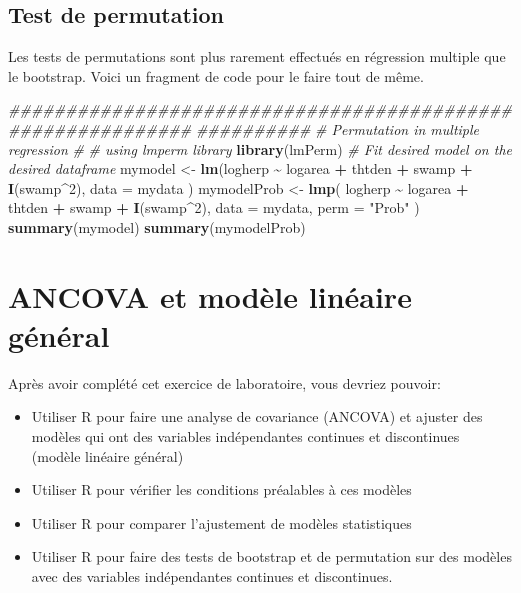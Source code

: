 \documentclass[
  12pt,
]{book}
\newenvironment{Shaded}{\begin{snugshade}}{\end{snugshade}}
\newcommand{\CommentTok}[1]{\textcolor[rgb]{0.56,0.35,0.01}{\textit{#1}}}
\newcommand{\DataTypeTok}[1]{\textcolor[rgb]{0.13,0.29,0.53}{#1}}
\newcommand{\DecValTok}[1]{\textcolor[rgb]{0.00,0.00,0.81}{#1}}
\newcommand{\KeywordTok}[1]{\textcolor[rgb]{0.13,0.29,0.53}{\textbf{#1}}}
\newcommand{\NormalTok}[1]{#1}
\newcommand{\OperatorTok}[1]{\textcolor[rgb]{0.81,0.36,0.00}{\textbf{#1}}}
\newcommand{\StringTok}[1]{\textcolor[rgb]{0.31,0.60,0.02}{#1}}
\providecommand{\tightlist}{%
  \setlength{\itemsep}{0pt}\setlength{\parskip}{0pt}}
\begin{document}
\hypertarget{perm_reg_mult}{%
\section{Test de permutation}\label{perm_reg_mult}}

Les tests de permutations sont plus rarement effectués en régression multiple que le bootstrap. Voici un fragment de code pour le faire tout de même.

\begin{Shaded}
\begin{Highlighting}[]
\CommentTok{\#\#\#\#\#\#\#\#\#\#\#\#\#\#\#\#\#\#\#\#\#\#\#\#\#\#\#\#\#\#\#\#\#\#\#\#\#\#\#\#\#\#\#\#\#\#\#\#\#\#\#\#\#\#\#\#\#\#\#\#}
\CommentTok{\#\#\#\#\#\#\#\#\#\#}
\CommentTok{\# Permutation in multiple regression}
\CommentTok{\#}
\CommentTok{\# using lmperm library}
\KeywordTok{library}\NormalTok{(lmPerm)}
\CommentTok{\# Fit desired model on the desired dataframe}
\NormalTok{mymodel \textless{}{-}}\StringTok{ }\KeywordTok{lm}\NormalTok{(logherp }\OperatorTok{\textasciitilde{}}\StringTok{ }\NormalTok{logarea }\OperatorTok{+}\StringTok{ }\NormalTok{thtden }\OperatorTok{+}\StringTok{ }\NormalTok{swamp }\OperatorTok{+}\StringTok{ }\KeywordTok{I}\NormalTok{(swamp}\OperatorTok{\^{}}\DecValTok{2}\NormalTok{),}
  \DataTypeTok{data =}\NormalTok{ mydata}
\NormalTok{)}
\NormalTok{mymodelProb \textless{}{-}}\StringTok{ }\KeywordTok{lmp}\NormalTok{(}
\NormalTok{  logherp }\OperatorTok{\textasciitilde{}}\StringTok{ }\NormalTok{logarea }\OperatorTok{+}\StringTok{ }\NormalTok{thtden }\OperatorTok{+}\StringTok{ }\NormalTok{swamp }\OperatorTok{+}\StringTok{ }\KeywordTok{I}\NormalTok{(swamp}\OperatorTok{\^{}}\DecValTok{2}\NormalTok{),}
  \DataTypeTok{data =}\NormalTok{ mydata, }\DataTypeTok{perm =} \StringTok{"Prob"}
\NormalTok{)}
\KeywordTok{summary}\NormalTok{(mymodel)}
\KeywordTok{summary}\NormalTok{(mymodelProb)}
\end{Highlighting}
\end{Shaded}

\hypertarget{ancova-et-moduxe8le-linuxe9aire-guxe9nuxe9ral}{%
\chapter{ANCOVA et modèle linéaire général}\label{ancova-et-moduxe8le-linuxe9aire-guxe9nuxe9ral}}

Après avoir complété cet exercice de laboratoire, vous devriez pouvoir:

\begin{itemize}
\tightlist
\item
  Utiliser R pour faire une analyse de covariance (ANCOVA) et ajuster des modèles qui ont des variables indépendantes continues et discontinues (modèle linéaire général)
\item
  Utiliser R pour vérifier les conditions préalables à ces modèles
\item
  Utiliser R pour comparer l'ajustement de modèles statistiques
\item
  Utiliser R pour faire des tests de bootstrap et de permutation sur des modèles avec des variables indépendantes continues et discontinues.
\end{itemize}
\end{document}

